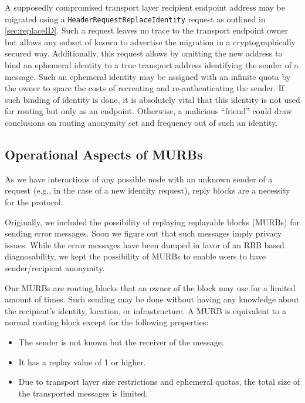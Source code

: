 A supposedly compromised transport layer recipient endpoint address may be migrated using a \texttt{HeaderRequestReplaceIdentity} request as outlined in \cref{sec:replaceID}. Such a request leaves no trace to the transport endpoint owner but allows any subset of known \VortexNode{} to advertise the migration in a cryptographically secured way. Additionally, this request allows by omitting the new address to bind an ephemeral identity to a true transport address identifying the sender of a message. Such an ephemeral identity may be assigned with an infinite quota by the owner to spare the costs of recreating and re-authenticating the sender. If such binding of identity is done, it is absolutely vital that this identity is not used for routing but only as an endpoint. Otherwise, a malicious ``friend'' could draw conclusions on routing anonymity set and frequency out of such an identity.

\subsection{Operational Aspects of MURBs\label{sec:murb}}
As we have interactions of any possible node with an unknown sender of a request (e.g., in the case of a new identity request), reply blocks are a necessity for the \MessageVortex{} protocol.

Originally, we included the possibility of replaying replayable blocks (MURBs) for sending error messages. Soon we figure out that such messages imply privacy issues. While the error messages have been dumped in favor of an RBB based diagnosability, we kept the possibility of MURBs to enable users to have sender/recipient anonymity. 

Our MURBs are routing blocks that an owner of the block may use for a limited amount of times. Such sending may be done without having any knowledge about the recipient's identity, location, or infrastructure. A MURB is equivalent to a normal routing block except for the following properties:

\begin{itemize}
	\item The sender is not known but the receiver of the message.
	\item It has a replay value of 1 or higher.
	\item Due to transport layer size restrictions and ephemeral quotas, the total size of the transported messages is limited.
\end{itemize}

